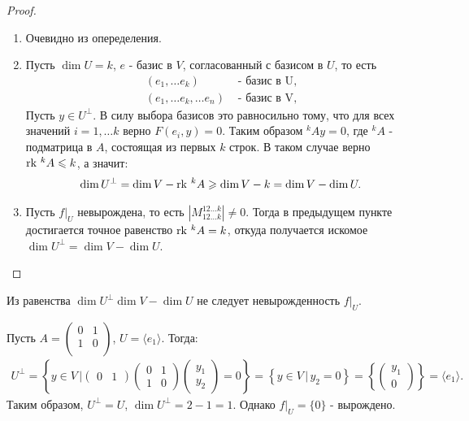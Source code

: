\begin{proof}~
    \begin{enumerate}
        \item Очевидно из опеределения.
        \item Пусть $\dim U = k$, $e$ - базис в $V$, согласованный с базисом в $U$, то есть 
        \begin{align*}
            (e_1, \dots e_k) & \text{ - базис в U}, \\
            (e_1, \dots e_k, \dots e_n) & \text{ - базис в V},
        \end{align*}
        Пусть $y \in U^{\perp}$. В силу выбора базисов это равносильно тому, что для всех значений 
        $i = 1, \dots k$ верно $F(e_i, y) = 0$.
        Таким образом $^k A y = 0$, где $^k A$ - подматрица в $A$, состоящая из первых $k$ строк.
        В таком случае верно $\operatorname{rk} \, ^k A \leqslant k$, а значит:
        \begin{gather*}
            \dim U^{\perp} = \dim V - \operatorname{rk} \, ^k A \geqslant \dim V - k = \dim V - \dim U.
        \end{gather*}
        \item Пусть $f \vert_{U}$ невырождена, то есть $| M_{12\dots k}^{12\dots k} | \neq 0$. 
        Тогда в предыдущем пункте достигается точное равенство $\operatorname{rk} \, ^k A = k$, 
        откуда получается искомое $\dim U^{\perp} = \dim V - \dim U$.
    \end{enumerate}
\end{proof}

\begin{note}
    Из равенства $\dim U^{\perp} \dim V - \dim U$ не следует невырожденность $f \vert_{U}$.
\end{note}

\begin{example}
    Пусть $A = \begin{pmatrix}
        0      & 1   \\
        1      & 0   \\
    \end{pmatrix}$, $U = \langle e_1 \rangle$. Тогда: 
    \begin{gather*}
        U^{\perp} = \left\{ y \in V \,\Big\vert \begin{pmatrix}
            0  & 1
        \end{pmatrix} \begin{pmatrix}
            0  & 1   \\
            1  & 0 
        \end{pmatrix} \begin{pmatrix}
            y_1   \\
            y_2  
        \end{pmatrix} = 0 \right\} = \left\{ y \in V \,\big\vert \, y_2 = 0\right\} = \left\{
        \begin{pmatrix}
            y_1   \\
            0  
        \end{pmatrix}\right\} = \langle e_1 \rangle.
    \end{gather*}
    Таким образом, $U^{\perp} = U$, $\dim U^{\perp} = 2 - 1 = 1$. Однако $f \vert_{U} = \{0\}$ - 
    вырождено.
\end{example}


